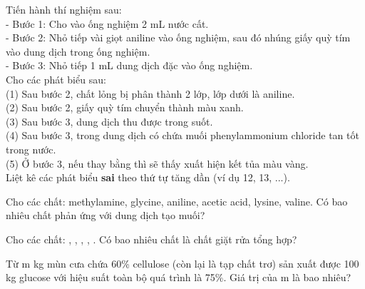 \documentclass[11pt,a4paper]{article}
\begin{document}
\begin{ex}
Tiến hành thí nghiệm sau:\\
- Bước 1: Cho vào ống nghiệm 2 mL nước cất.\\
- Bước 2: Nhỏ tiếp vài giọt aniline vào ống nghiệm, sau đó nhúng giấy quỳ tím vào dung dịch trong ống nghiệm.\\
- Bước 3: Nhỏ tiếp 1 mL dung dịch  đặc vào ống nghiệm.\\
Cho các phát biểu sau:\\
(1) Sau bước 2, chất lỏng bị phân thành 2 lớp, lớp dưới là aniline.\\
(2) Sau bước 2, giấy quỳ tím chuyển thành màu xanh.\\
(3) Sau bước 3, dung dịch thu được trong suốt.\\
(4) Sau bước 3, trong dung dịch có chứa muối phenylammonium chloride tan tốt trong nước.\\
(5) Ở bước 3, nếu thay  bằng  thì sẽ thấy xuất hiện kết tủa màu vàng.\\
Liệt kê các phát biểu \textbf{sai} theo thứ tự tăng dần (ví dụ 12, 13, ...).
\end{ex}

\begin{ex}
Cho các chất: methylamine, glycine, aniline, acetic acid, lysine, valine. Có bao nhiêu chất phản ứng với dung dịch  tạo muối?
\end{ex}

\begin{ex}
Cho các chất: , , , , . Có bao nhiêu chất là chất giặt rửa tổng hợp?
\end{ex}

\begin{ex}
Từ m kg mùn cưa chứa 60\% cellulose (còn lại là tạp chất trơ) sản xuất được 100 kg glucose với hiệu suất toàn bộ quá trình là 75\%. Giá trị của m là bao nhiêu?
\end{ex}
\end{document}
